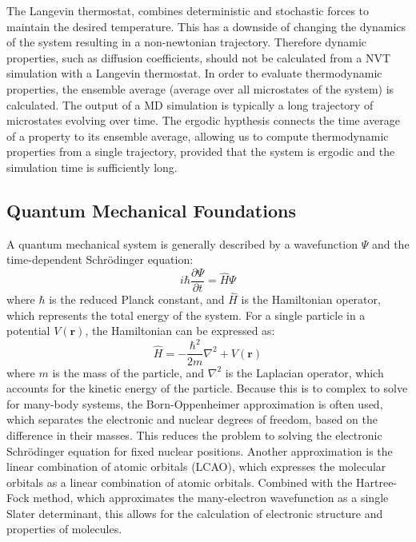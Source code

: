 The Langevin thermostat, combines deterministic and stochastic forces to maintain the desired temperature. This has a downside of changing the dynamics of the system resulting in a non-newtonian trajectory. Therefore dynamic properties, such as diffusion coefficients, should not be calculated from a NVT simulation with a Langevin thermostat.
In order to evaluate thermodynamic properties, the ensemble average (average over all microstates of the system) is calculated. The output of a MD simulation is typically a long trajectory of microstates evolving over time.
The ergodic hypthesis connects the time average of a property to its ensemble average, allowing us to compute thermodynamic properties from a single trajectory, provided that the system is ergodic and the simulation time is sufficiently long.

\subsection{Quantum Mechanical Foundations}

A quantum mechanical system is generally described by a wavefunction \(\Psi\) and the time-dependent Schrödinger equation:
\begin{equation}
    i \hbar \frac{\partial \Psi}{\partial t} = \hat{H} \Psi
\end{equation}
where \(\hbar\) is the reduced Planck constant, and \(\hat{H}\) is the Hamiltonian operator, which represents the total energy of the system. For a single particle in a potential \(V(\textbf{r})\), the Hamiltonian can be expressed as:
\begin{equation}
    \hat{H} = -\frac{\hbar^2}{2m} \nabla^2 + V(\textbf{r})
\end{equation}
where \(m\) is the mass of the particle, and \(\nabla^2\) is the Laplacian operator, which accounts for the kinetic energy of the particle.
Because this is to complex to solve for many-body systems, the Born-Oppenheimer approximation is often used, which separates the electronic and nuclear degrees of freedom, based on the difference in their masses.
This reduces the problem to solving the electronic Schrödinger equation for fixed nuclear positions.
Another approximation is the linear combination of atomic orbitals (LCAO), which expresses the molecular orbitals as a linear combination of atomic orbitals. Combined with the Hartree-Fock method, which approximates the many-electron wavefunction as a single Slater determinant, this allows for the calculation of electronic structure and properties of molecules.


